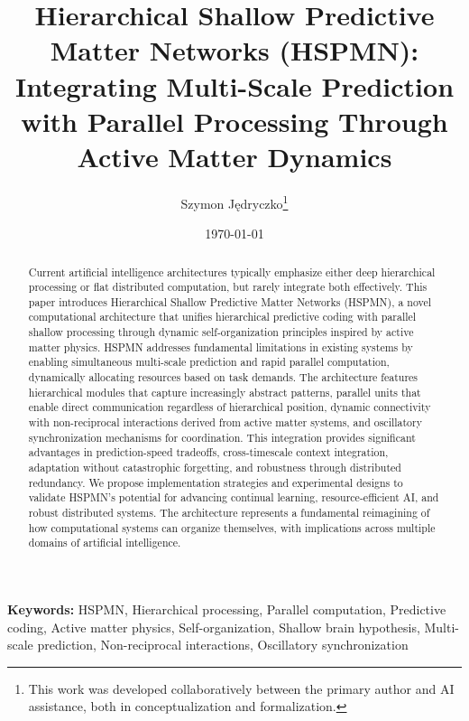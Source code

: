 \documentclass[11pt,a4paper,twocolumn]{article}
\begin{document}
\title{\textbf{Hierarchical Shallow Predictive Matter Networks (HSPMN): \\
Integrating Multi-Scale Prediction with Parallel Processing Through Active Matter Dynamics}}

\author{Szymon Jędryczko\thanks{This work was developed collaboratively between the primary author and AI assistance, both in conceptualization and formalization.}}

\date{\today}

\maketitle

\begin{abstract}
Current artificial intelligence architectures typically emphasize either deep hierarchical processing or flat distributed computation, but rarely integrate both effectively. This paper introduces Hierarchical Shallow Predictive Matter Networks (HSPMN), a novel computational architecture that unifies hierarchical predictive coding with parallel shallow processing through dynamic self-organization principles inspired by active matter physics. HSPMN addresses fundamental limitations in existing systems by enabling simultaneous multi-scale prediction and rapid parallel computation, dynamically allocating resources based on task demands. The architecture features hierarchical modules that capture increasingly abstract patterns, parallel units that enable direct communication regardless of hierarchical position, dynamic connectivity with non-reciprocal interactions derived from active matter systems, and oscillatory synchronization mechanisms for coordination. This integration provides significant advantages in prediction-speed tradeoffs, cross-timescale context integration, adaptation without catastrophic forgetting, and robustness through distributed redundancy. We propose implementation strategies and experimental designs to validate HSPMN's potential for advancing continual learning, resource-efficient AI, and robust distributed systems. The architecture represents a fundamental reimagining of how computational systems can organize themselves, with implications across multiple domains of artificial intelligence.
\end{abstract}

\noindent\textbf{Keywords:} HSPMN, Hierarchical processing, Parallel computation, Predictive coding, Active matter physics, Self-organization, Shallow brain hypothesis, Multi-scale prediction, Non-reciprocal interactions, Oscillatory synchronization
\end{document}
